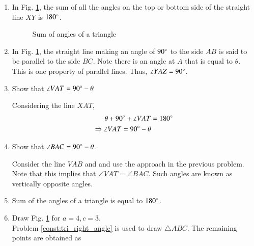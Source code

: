 \renewcommand{\theequation}{\theenumi}
\begin{enumerate}[label=\thesection.\arabic*.,ref=\thesection.\theenumi]
\item 	In Fig. \ref{fig:tri_sum_angle}, the sum of all the angles on the top or bottom side of the straight line $XY$ is $180\degree$.


\begin{figure}[!ht]
	\begin{center}
		\resizebox{\columnwidth}{!}{}
	\end{center}
	\caption{Sum of angles of a triangle}
	\label{fig:tri_sum_angle}	
\end{figure}



\item
In Fig. \ref{fig:tri_sum_angle}, the straight line making an angle of $90\degree$ to the side $AB$ is said to be parallel to the side $BC$. Note there is an angle at $A$ that is equal to $\theta$.  This is one property of parallel lines.  Thus, $\angle YAZ = 90\degree$.


\item
	Show that $\angle VAT = 90\degree - \theta$
		
	\solution Considering the line $XAT$,
	\begin{align}
	\theta + 90\degree + \angle VAT &= 180\degree \\
	\Rightarrow  \angle VAT =  90\degree - \theta
	\end{align}

\item
	\label{prob:tri_compl_angle}
	Show that $\angle BAC = 90\degree - \theta$.
	
	\solution Consider the line $VAB$ and and use the approach in the previous problem.  Note that this implies that $\angle VAT = \angle BAC$.  Such angles are known as vertically opposite angles. 
	 
\item
Sum of the angles of a triangle is equal to $180\degree$.
%
\iffalse
\item Draw Fig. \ref{fig:tri_sum_angle} for $a = 4, c =3$.
%
\\
\solution Problem \ref{const:tri_right_angle} is used to draw $\triangle ABC$.  
		The remaining points are obtained as


\end{enumerate}
